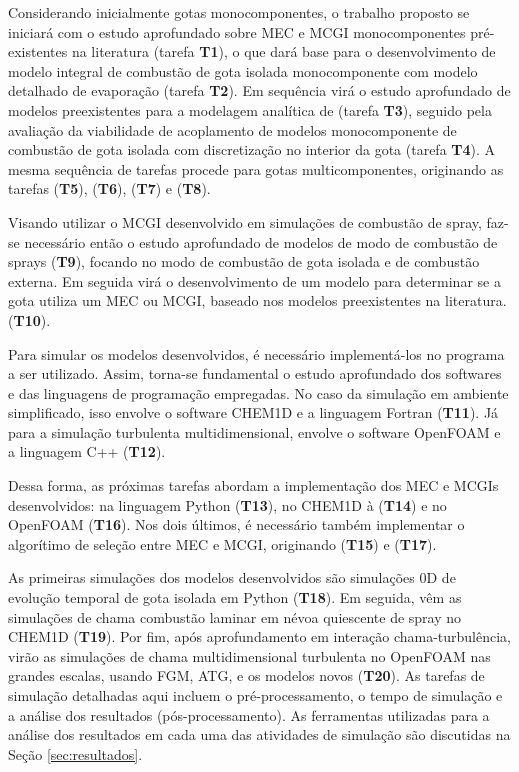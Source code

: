 Considerando inicialmente gotas monocomponentes, o trabalho proposto se iniciará com o estudo aprofundado sobre MEC e MCGI monocomponentes pré-existentes na literatura (tarefa \textbf{T1}), o que dará base para o desenvolvimento de modelo integral de combustão de gota isolada monocomponente com modelo detalhado de evaporação (tarefa \textbf{T2}).
Em sequência virá o estudo aprofundado de modelos preexistentes para a modelagem analítica de   (tarefa \textbf{T3}), seguido pela avaliação da viabilidade de acoplamento de modelos monocomponente de combustão de gota isolada com discretização no interior da gota (tarefa \textbf{T4}).
A mesma sequência de tarefas procede para gotas multicomponentes, originando as tarefas (\textbf{T5}), (\textbf{T6}), (\textbf{T7}) e (\textbf{T8}). 

Visando utilizar o MCGI desenvolvido em simulações de combustão de spray, faz-se necessário então o estudo aprofundado de modelos de modo de combustão de sprays (\textbf{T9}), focando no modo de combustão de gota isolada e de combustão externa. Em seguida virá o desenvolvimento de um modelo para determinar se a gota utiliza um MEC ou MCGI, baseado nos modelos preexistentes na literatura. (\textbf{T10}).

Para simular os modelos desenvolvidos, é necessário implementá-los no programa a ser utilizado.
Assim, torna-se fundamental o estudo aprofundado dos softwares e das linguagens de programação empregadas. 
No caso da simulação em ambiente simplificado, isso envolve o software CHEM1D e a linguagem Fortran (\textbf{T11}).
Já para a simulação turbulenta multidimensional, envolve o software OpenFOAM e a linguagem C++ (\textbf{T12}).

Dessa forma, as próximas tarefas abordam a implementação dos MEC e MCGIs desenvolvidos: na linguagem Python  (\textbf{T13}), no  CHEM1D à  (\textbf{T14}) e no OpenFOAM  (\textbf{T16}).
Nos dois últimos, é necessário também implementar o algorítimo de seleção entre MEC e MCGI, originando (\textbf{T15}) e (\textbf{T17}).  

As primeiras simulações dos modelos desenvolvidos são simulações 0D de evolução temporal de gota isolada em Python (\textbf{T18}). 
Em seguida, vêm as simulações de chama combustão laminar em névoa quiescente de spray no CHEM1D (\textbf{T19}).
Por fim, após aprofundamento em interação chama-turbulência, virão as simulações de chama multidimensional turbulenta no OpenFOAM nas grandes escalas, usando FGM, ATG, e os modelos novos (\textbf{T20}).
As tarefas de simulação detalhadas aqui incluem o pré-processamento, o tempo de simulação e a análise dos resultados (pós-processamento).
As ferramentas utilizadas para a análise dos resultados em cada uma das atividades de simulação são discutidas na Seção \ref{sec:resultados}.

